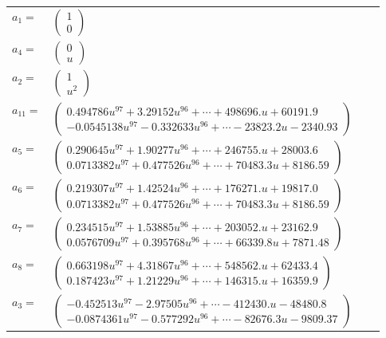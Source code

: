 \documentclass[1p]{elsarticle_modified}
\theoremstyle{definition}
\begin{document}
\begin{tabular}{m{7pt} m{180pt} m{7pt} m{180pt} }
\flushright $a_{1}=$&$\begin{pmatrix}1\\0\end{pmatrix}$ \\
\flushright $a_{4}=$&$\begin{pmatrix}0\\u\end{pmatrix}$ \\
\flushright $a_{2}=$&$\begin{pmatrix}1\\u^2\end{pmatrix}$ \\
\flushright $a_{11}=$&$\begin{pmatrix}0.494786 u^{97}+3.29152 u^{96}+\cdots+498696. u+60191.9\\-0.0545138 u^{97}-0.332633 u^{96}+\cdots-23823.2 u-2340.93\end{pmatrix}$ \\
\flushright $a_{5}=$&$\begin{pmatrix}0.290645 u^{97}+1.90277 u^{96}+\cdots+246755. u+28003.6\\0.0713382 u^{97}+0.477526 u^{96}+\cdots+70483.3 u+8186.59\end{pmatrix}$ \\
\flushright $a_{6}=$&$\begin{pmatrix}0.219307 u^{97}+1.42524 u^{96}+\cdots+176271. u+19817.0\\0.0713382 u^{97}+0.477526 u^{96}+\cdots+70483.3 u+8186.59\end{pmatrix}$ \\
\flushright $a_{7}=$&$\begin{pmatrix}0.234515 u^{97}+1.53885 u^{96}+\cdots+203052. u+23162.9\\0.0576709 u^{97}+0.395768 u^{96}+\cdots+66339.8 u+7871.48\end{pmatrix}$ \\
\flushright $a_{8}=$&$\begin{pmatrix}0.663198 u^{97}+4.31867 u^{96}+\cdots+548562. u+62433.4\\0.187423 u^{97}+1.21229 u^{96}+\cdots+146315. u+16359.9\end{pmatrix}$ \\
\flushright $a_{3}=$&$\begin{pmatrix}-0.452513 u^{97}-2.97505 u^{96}+\cdots-412430. u-48480.8\\-0.0874361 u^{97}-0.577292 u^{96}+\cdots-82676.3 u-9809.37\end{pmatrix}$ \\

\end{tabular}
\end{document}
